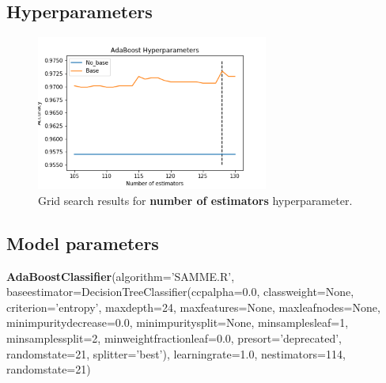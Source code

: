 \documentclass[11pt, letterpaper]{article}
\begin{document}
\subsection{Hyperparameters}
\begin{figure}[h]
\begin{center}
\includegraphics[width=3in]{ABHyperparameters.png}
\caption{Grid search results for \textbf{number of estimators} hyperparameter.} 
\label{fig:ABHyper}
\end{center}
\end{figure}

\subsection{Model parameters}
\noindent \textbf{AdaBoostClassifier}(algorithm='SAMME.R',
                   base\textunderscore estimator=DecisionTreeClassifier(ccp\textunderscore alpha=0.0,
                                                         class\textunderscore weight=None,
                                                         criterion='entropy',
                                                         max\textunderscore depth=24,
                                                         max\textunderscore features=None,
                                                         max\textunderscore leaf\textunderscore nodes=None,
                                                         min\textunderscore impurity\textunderscore decrease=0.0,
                                                         min\textunderscore impurity\textunderscore split=None,
                                                         min\textunderscore samples\textunderscore leaf=1,
                                                         min\textunderscore samples\textunderscore split=2,
                                                         min\textunderscore weight\textunderscore fraction\textunderscore leaf=0.0,
                                                         presort='deprecated',
                                                         random\textunderscore state=21,
                                                         splitter='best'),
                   learning\textunderscore rate=1.0, n\textunderscore estimators=114, random\textunderscore state=21)
\end{document}
